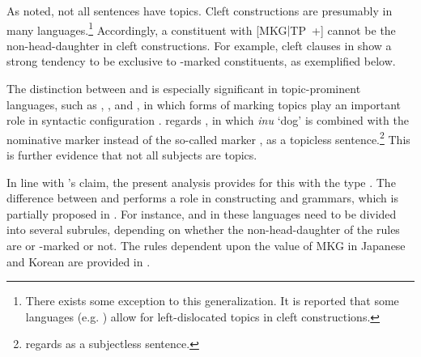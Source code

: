 As noted, not all sentences have topics.
Cleft constructions are presumably  in many
languages.\footnote{There exists some exception to this
  generalization. It is reported that some languages
  (e.g. ) allow for left-dislocated topics in cleft
  constructions.} Accordingly, a constituent with \mbox{[MKG{$\mid$}TP
    +]} cannot be the non-head-daughter in cleft constructions. For
example, cleft clauses in  show a strong tendency to be
exclusive to \nun-marked constituents, as exemplified below.




The distinction between  and  is
especially significant in topic-prominent languages, such as
, , and , in which forms of
marking topics play an important role in syntactic configuration
\citep{li:thompson:76,huang:84}.
\citet{lambrecht:96} regards , in which \textit{inu}
`dog' is combined with the nominative marker \ga instead of the
so-called  marker \wa, as a topicless
sentence.\footnote{\citet{kuroda:72} regards  as a
  subjectless sentence.}  This is further evidence that not all
subjects are topics.




\noindent In line with \citeauthor{lambrecht:96}'s claim, the present
analysis provides for this with the type .  The
difference between  and  performs a
role in constructing  and  grammars, which
is partially proposed in \citet{song:bender:11}. For instance,
 and  in these languages need
to be divided into several subrules, depending on whether the
non-head-daughter of the rules are \wa or \nun-marked or not.  The
rules dependent upon the value of MKG in Japanese and Korean are
provided in .




